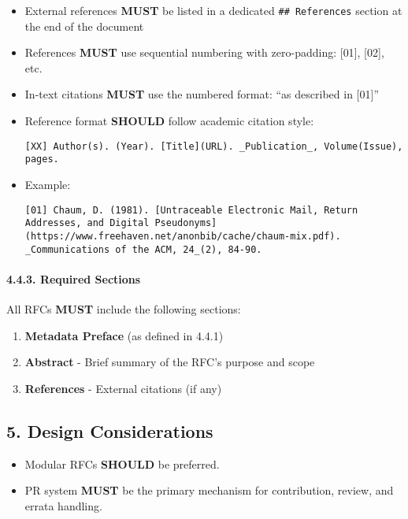 \begin{itemize}
\item
  External references \textbf{MUST} be listed in a dedicated
  \texttt{\#\#\ References} section at the end of the document
\item
  References \textbf{MUST} use sequential numbering with zero-padding:
  {[}01{]}, {[}02{]}, etc.
\item
  In-text citations \textbf{MUST} use the numbered format: ``as
  described in {[}01{]}''
\item
  Reference format \textbf{SHOULD} follow academic citation style:

\begin{verbatim}
[XX] Author(s). (Year). [Title](URL). _Publication_, Volume(Issue), pages.
\end{verbatim}
\item
  Example:

\begin{verbatim}
[01] Chaum, D. (1981). [Untraceable Electronic Mail, Return Addresses, and Digital Pseudonyms](https://www.freehaven.net/anonbib/cache/chaum-mix.pdf). _Communications of the ACM, 24_(2), 84-90.
\end{verbatim}
\end{itemize}

\paragraph{4.4.3. Required Sections}\label{required-sections}

All RFCs \textbf{MUST} include the following sections:

\begin{enumerate}
\def\labelenumi{\arabic{enumi}.}
\tightlist
\item
  \textbf{Metadata Preface} (as defined in 4.4.1)
\item
  \textbf{Abstract} - Brief summary of the RFC's purpose and scope
\item
  \textbf{References} - External citations (if any)
\end{enumerate}

\subsection{5. Design Considerations}\label{design-considerations}

\begin{itemize}
\tightlist
\item
  Modular RFCs \textbf{SHOULD} be preferred.
\item
  PR system \textbf{MUST} be the primary mechanism for contribution,
  review, and errata handling.
\end{itemize}

